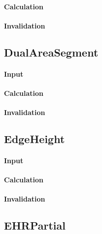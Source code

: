 \paragraph{Calculation}

\paragraph{Invalidation}

\bigskip

\subsection{DualAreaSegment}

\paragraph{Input}

\paragraph{Calculation}

\paragraph{Invalidation}

\bigskip

\subsection{EdgeHeight}

\paragraph{Input}

\paragraph{Calculation}

\paragraph{Invalidation}

\bigskip

\subsection{EHRPartial}

